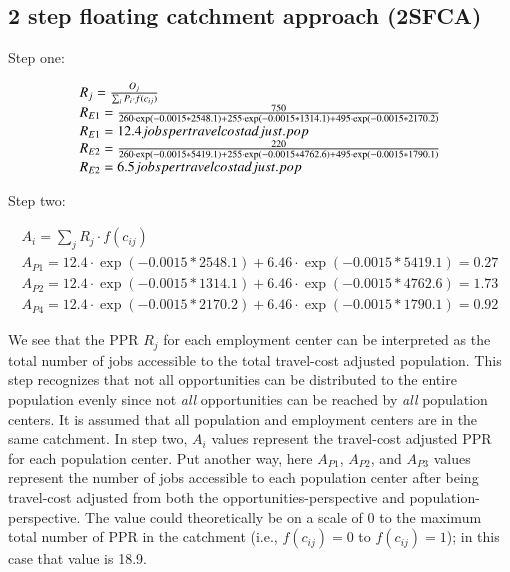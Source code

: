\documentclass[]{elsarticle} %
\begin{document}
\hypertarget{step-floating-catchment-approach-2sfca}{%
\subsection{2 step floating catchment approach
(2SFCA)}\label{step-floating-catchment-approach-2sfca}}

Step one:

\begin{equation}
\begin{array}{l}
R_{j} = \frac{O_{j}}{\sum_i P_{i} \cdot f(c_{ij})}\\

R_{E1} = \frac{750}{260 \cdot \exp(-0.0015 *2548.1) + 255 \cdot \exp(-0.0015 *1314.1) + 495 \cdot \exp(-0.0015 *2170.2)}\\
R_{E1} = 12.4 \space jobs \space per \space travel \space cost \space adjust. \space pop\\
R_{E2} = \frac{220}{260 \cdot \exp(-0.0015 *5419.1) + 255 \cdot \exp(-0.0015 *4762.6) + 495 \cdot \exp(-0.0015 *1790.1)}\\
R_{E2} = 6.5 \space jobs \space per \space travel \space cost \space adjust. \space pop\\
\end{array}
\end{equation}

Step two:

\begin{equation}
\begin{array}{l}
A_{i} = {\sum_j R_{j} \cdot f(c_{ij})}\\
A_{P1} = 12.4 \cdot \exp(-0.0015 *2548.1) + 6.46 \cdot \exp(-0.0015 *5419.1) = 0.27 \\
A_{P2} = 12.4 \cdot \exp(-0.0015 *1314.1) + 6.46 \cdot \exp(-0.0015 *4762.6) = 1.73 \\
A_{P4} = 12.4 \cdot \exp(-0.0015 *2170.2) + 6.46 \cdot \exp(-0.0015 *1790.1) = 0.92
\end{array}
\end{equation}

We see that the PPR \(R_{j}\) for each employment center can be
interpreted as the total number of jobs accessible to the total
travel-cost adjusted population. This step recognizes that not all
opportunities can be distributed to the entire population evenly since
not \emph{all} opportunities can be reached by \emph{all} population
centers. It is assumed that all population and employment centers are in
the same catchment. In step two, \(A_{i}\) values represent the
travel-cost adjusted PPR for each population center. Put another way,
here \(A_{P1}\), \(A_{P2}\), and \(A_{P3}\) values represent the number
of jobs accessible to each population center after being travel-cost
adjusted from both the opportunities-perspective and
population-perspective. The value could theoretically be on a scale of 0
to the maximum total number of PPR in the catchment (i.e.,
\(f(c_{ij})=0\) to \(f(c_{ij})=1\)); in this case that value is 18.9.
\end{document}
